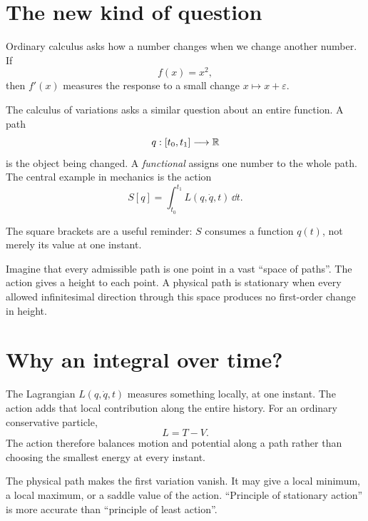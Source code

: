 \documentclass[11pt,a4paper]{article}
\begin{document}
\tableofcontents
\clearpage

\section{The new kind of question}

Ordinary calculus asks how a number changes when we change another number. If
\[
f(x)=x^2,
\]
then $f'(x)$ measures the response to a small change $x\mapsto x+\varepsilon$.

The calculus of variations asks a similar question about an entire function. A path
\[
q:[t_0,t_1]\longrightarrow\mathbb R
\]
is the object being changed. A \emph{functional} assigns one number to the whole path. The central example in mechanics is the action
\[
\boxed{S[q]=\int_{t_0}^{t_1}L(q,\dot q,t)\,\dd t.}
\]

The square brackets are a useful reminder: $S$ consumes a function $q(t)$, not merely its value at one instant.

\begin{intuition}
Imagine that every admissible path is one point in a vast ``space of paths''. The action gives a height to each point. A physical path is stationary when every allowed infinitesimal direction through this space produces no first-order change in height.
\end{intuition}

\section{Why an integral over time?}

The Lagrangian $L(q,\dot q,t)$ measures something locally, at one instant. The action adds that local contribution along the entire history. For an ordinary conservative particle,
\[
L=T-V.
\]
The action therefore balances motion and potential along a path rather than choosing the smallest energy at every instant.

\begin{warningbox}
The physical path makes the first variation vanish. It may give a local minimum, a local maximum, or a saddle value of the action. ``Principle of stationary action'' is more accurate than ``principle of least action''.
\end{warningbox}
\end{document}
